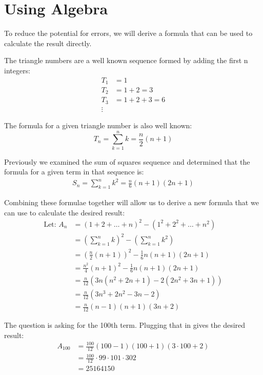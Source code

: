 \documentclass{article}
\begin{document}
\section*{Using Algebra}
To reduce the potential for errors, we will derive a formula that can be used to calculate the result directly.

The triangle numbers are a well known sequence formed by adding the first n integers:
\[\begin{aligned}
    T_1 &= 1 \\
    T_2 &= 1 + 2 = 3 \\
    T_3 &= 1 + 2 + 3 = 6 \\
    \vdots
\end{aligned}\]

The formula for a given triangle number is also well known:
\[T_n = \sum_{k=1}^{n}k = \frac{n}{2}(n+1)\]

Previously we examined the sum of squares sequence and determined that the formula for a given term in that sequence is:
\[\begin{aligned}
    S_n = \sum_{k=1}^{n}k^2 = \frac{n}{6}(n+1)(2n+1)
\end{aligned}\]

Combining these formulae together will allow us to derive a new formula that we can use to calculate the desired result:
\[\begin{aligned}
    \text{Let: } A_n &= (1+2+\dots+n)^2 - (1^2 + 2^2 + \dots + n^2) \\
    &= \left(\sum_{k=1}^{n}k\right)^2 - \left(\sum_{k=1}^{n}k^2\right) \\
    &= \left(\frac{n}{2}(n+1)\right)^2 - \frac{1}{6}n(n+1)(2n+1) \\
    &= \frac{n^2}{4}(n+1)^2 - \frac{1}{6}n(n+1)(2n+1) \\
    &= \frac{n}{12}\left(3n(n^2+2n+1)-2(2n^2+3n+1)\right) \\
    &= \frac{n}{12}\left(3n^3 + 2n^2 - 3n - 2\right) \\
    &= \frac{n}{12}(n-1)(n+1)(3n+2)
\end{aligned}\]

The question is asking for the 100th term. Plugging that in gives the desired result:
\[\begin{aligned}
    A_{100} &= \frac{100}{12}(100-1)(100+1)(3\cdot100+2) \\
    &= \frac{100}{12}\cdot99\cdot101\cdot302 \\
    &= 25164150
\end{aligned}\]
\end{document}
